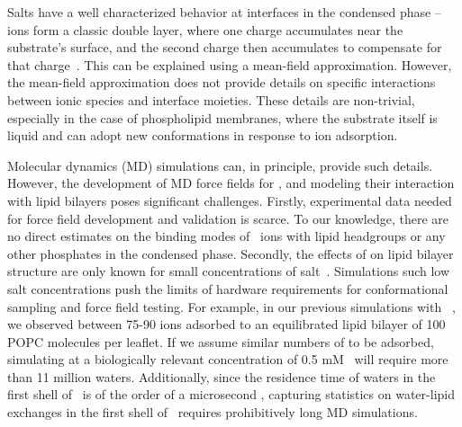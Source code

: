 Salts have a well characterized behavior at interfaces in the condensed phase -- ions form a classic double layer, where
one charge accumulates near the substrate's surface, and the second charge then accumulates to compensate for 
that charge~\cite{israelachvili:2011:intermol}.
This can be explained using a mean-field approximation. 
However, the mean-field approximation does not provide details on specific interactions between ionic species and 
interface moieties. These details are non-trivial, especially in the case of
phospholipid membranes, where the substrate itself is liquid and can adopt new conformations in response to ion adsorption. 

Molecular dynamics (MD) simulations can, in principle, provide such details. 
However, the development of MD force fields for \mg{}, and modeling their interaction with lipid bilayers poses significant challenges.
Firstly, experimental data needed for force field development and validation is scarce.
To our knowledge, there are no direct estimates on the binding modes of \mg~ions with lipid headgroups or any other phosphates in the condensed phase. 
Secondly, the effects of \mg{} on lipid bilayer structure are only known for small concentrations
of salt~\cite{kurakin:2022:cations,kurakin:2021:effect}.
Simulations such low salt concentrations push the limits of hardware requirements for conformational sampling and force field testing. 
For example, in our previous simulations with \na{}~\cite{saunders:2022}, we observed between 75-90 \na{} ions adsorbed to an equilibrated lipid bilayer of 
100 POPC molecules per leaflet. If we assume similar numbers of \mg to be adsorbed, 
simulating at a biologically relevant concentration of 0.5 mM~\cite{romani:1992:regulation} will require more than 11 million waters.
Additionally, since the residence time of waters in the first shell of \mg~is 
of the order of a microsecond \cite{neely:1970,Palinkas:1982,bleuzen:1997}, 
capturing statistics on water-lipid exchanges in the first shell of \mg~requires prohibitively long MD simulations. 

